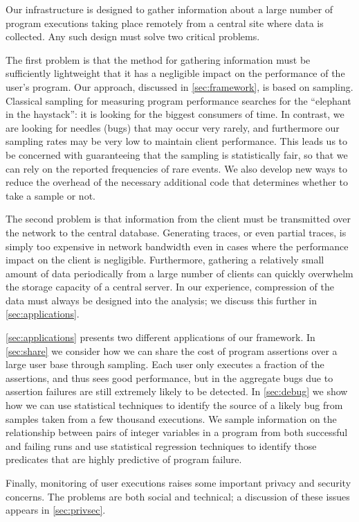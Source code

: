 Our infrastructure is designed to gather information about a large
number of program executions taking place remotely from a central site
where data is collected.  Any such design must solve two critical
problems.

The first problem is that the method for gathering information must be
sufficiently lightweight that it has a negligible impact on the
performance of the user's program.  Our approach, discussed in
\autoref{sec:framework}, is based on sampling.  Classical sampling for
measuring program performance searches for the ``elephant in the
haystack'': it is looking for the biggest consumers of time.  In
contrast, we are looking for needles (bugs) that may occur very
rarely, and furthermore our sampling rates may be very low to maintain
client performance.  This leads us to be concerned with guaranteeing
that the sampling is statistically fair, so that we can rely on the
reported frequencies of rare events.  We also develop new ways to
reduce the overhead of the necessary additional code that determines
whether to take a sample or not.

The second problem is that information from the client must be
transmitted over the network to the central database.  Generating
traces, or even partial traces, is simply too expensive in network
bandwidth even in cases where the performance impact on the client is
negligible.  Furthermore, gathering a relatively small amount of data
periodically from a large number of clients can quickly overwhelm the
storage capacity of a central server.  In our experience, compression
of the data must always be designed into the analysis; we discuss this
further in \autoref{sec:applications}.

\autoref{sec:applications} presents two different applications of our
framework.  In \autoref{sec:share} we consider how we can share the
cost of program assertions over a large user base through sampling.
Each user only executes a fraction of the assertions, and thus sees
good performance, but in the aggregate bugs due to assertion failures
are still extremely likely to be detected.  In \autoref{sec:debug} we
show how we can use statistical techniques to identify the source of a
likely bug from samples taken from a few thousand executions.  We
sample information on the relationship between pairs of integer
variables in a program from both successful and failing runs and use
statistical regression techniques to identify those predicates that
are highly predictive of program failure.

Finally, monitoring of user executions raises some important privacy
and security concerns.  The problems are both social and technical; a
discussion of these issues appears in \autoref{sec:privsec}.

